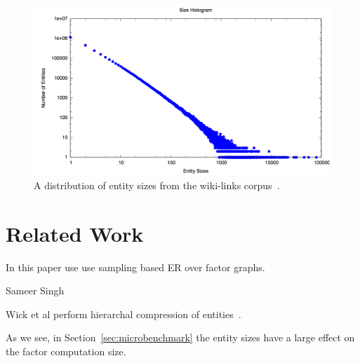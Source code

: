 \begin{figure}
\centering
\includegraphics[width=\columnwidth]{media/entity-distribution.png}
\caption{A distribution of entity sizes from the wiki-links corpus~\cite{singh12:wiki-links}.}
\label{fig:entity-distribution}
\end{figure}



\section{Related Work}

In this paper use use sampling based ER over factor graphs.

Sameer Singh~\cite{singh2011large}

Wick et al perform hierarchal compression of entities~\cite{Wick:2012:DHM:2390524.2390578}.


As we see, in Section~\ref{sec:microbenchmark} the entity sizes have a
large effect on the factor computation size.


